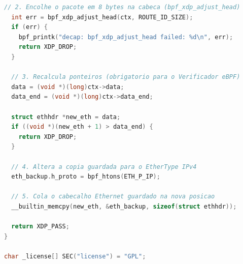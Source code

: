 \begin{apendicesenv}
\begin{lstlisting}[language=C, caption={Programa XDP nativo de remoção do rótulo na borda (\texttt{spolka\_edge\_decap.c}).}, label={lst:spolka_edge_decap}]
  // 2. Encolhe o pacote em 8 bytes na cabeca (bpf_xdp_adjust_head)
  int err = bpf_xdp_adjust_head(ctx, ROUTE_ID_SIZE);
  if (err) {
    bpf_printk("decap: bpf_xdp_adjust_head failed: %d\n", err);
    return XDP_DROP;
  }

  // 3. Recalcula ponteiros (obrigatorio para o Verificador eBPF)
  data = (void *)(long)ctx->data;
  data_end = (void *)(long)ctx->data_end;

  struct ethhdr *new_eth = data;
  if ((void *)(new_eth + 1) > data_end) {
    return XDP_DROP;
  }

  // 4. Altera a copia guardada para o EtherType IPv4
  eth_backup.h_proto = bpf_htons(ETH_P_IP);

  // 5. Cola o cabecalho Ethernet guardado na nova posicao
  __builtin_memcpy(new_eth, &eth_backup, sizeof(struct ethhdr));

  return XDP_PASS;
}

char _license[] SEC("license") = "GPL";
\end{lstlisting}

\end{apendicesenv}

